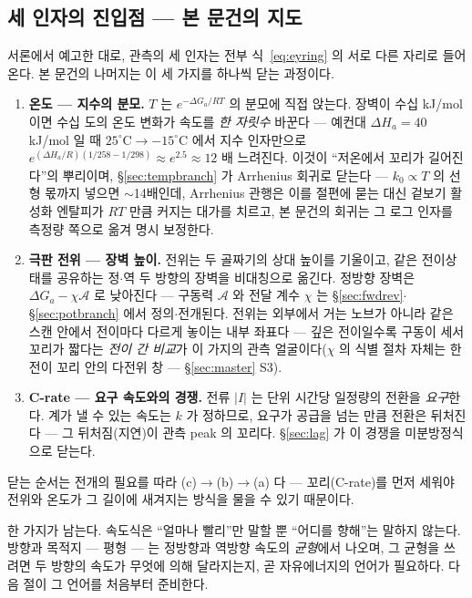 \documentclass[11pt,a4paper]{article}
\begin{document}
\subsection{세 인자의 진입점 — 본 문건의 지도}
서론에서 예고한 대로, 관측의 세 인자는 전부 식~\eqref{eq:eyring} 의 서로 다른 자리로 들어온다. 본 문건의
나머지는 이 세 가지를 하나씩 닫는 과정이다.
\begin{enumerate}[label=\textbf{(\alph*)},leftmargin=2.2em,itemsep=2pt]
\item \textbf{온도 — 지수의 분모.} $T$ 는 $e^{-\Delta G_a/RT}$ 의 분모에 직접 앉는다. 장벽이 수십
  kJ/mol 이면 수십 도의 온도 변화가 속도를 \emph{한 자릿수} 바꾼다 — 예컨대 $\Delta H_a=40$ kJ/mol 일 때
  $25^\circ\mathrm C\to-15^\circ\mathrm C$ 에서 지수 인자만으로
  $e^{(\Delta H_a/R)(1/258-1/298)}\approx e^{2.5}\approx12$ 배 느려진다. 이것이 ``저온에서 꼬리가
  길어진다''의 뿌리이며, \S\ref{sec:tempbranch} 가 Arrhenius 회귀로 닫는다 — $k_0\propto T$ 의 선형
  몫까지 넣으면 $\sim$14배인데, Arrhenius 관행은 이를 절편에 묻는 대신 겉보기 활성화 엔탈피가
  $RT$ 만큼 커지는 대가를 치르고, 본 문건의 회귀는 그 로그 인자를 측정량 쪽으로 옮겨 명시 보정한다.
\item \textbf{극판 전위 — 장벽 높이.} 전위는 두 골짜기의 상대 높이를 기울이고, 같은 전이상태를 공유하는
  정$\cdot$역 두 방향의 장벽을 비대칭으로 옮긴다. 정방향 장벽은 $\Delta G_a-\chi\mathcal A$ 로 낮아진다
  — 구동력 $\mathcal A$ 와 전달 계수 $\chi$ 는 \S\ref{sec:fwdrev}$\cdot$\S\ref{sec:potbranch} 에서
  정의$\cdot$전개된다. 전위는 외부에서 거는 노브가 아니라 같은 스캔 안에서 전이마다 다르게 놓이는 내부
  좌표다 — 깊은 전이일수록 구동이 세서 꼬리가 짧다는 \emph{전이 간 비교}가 이 가지의 관측
  얼굴이다($\chi$ 의 식별 절차 자체는 한 전이 꼬리 안의 다전위 창 — \S\ref{sec:master} S3).
\item \textbf{C-rate — 요구 속도와의 경쟁.} 전류 $|I|$ 는 단위 시간당 일정량의 전환을 \emph{요구}한다.
  계가 낼 수 있는 속도는 $k$ 가 정하므로, 요구가 공급을 넘는 만큼 전환은 뒤처진다 — 그 뒤처짐(지연)이
  관측 peak 의 꼬리다. \S\ref{sec:lag} 가 이 경쟁을 미분방정식으로 닫는다.
\end{enumerate}
닫는 순서는 전개의 필요를 따라 (c)$\to$(b)$\to$(a) 다 — 꼬리(C-rate)를 먼저 세워야 전위와 온도가 그
길이에 새겨지는 방식을 물을 수 있기 때문이다.

한 가지가 남는다. 속도식은 ``얼마나 빨리''만 말할 뿐 ``어디를 향해''는 말하지 않는다. 방향과 목적지 —
평형 — 는 정방향과 역방향 속도의 \emph{균형}에서 나오며, 그 균형을 쓰려면 두 방향의 속도가 무엇에 의해
달라지는지, 곧 자유에너지의 언어가 필요하다. 다음 절이 그 언어를 처음부터 준비한다.
\end{document}
